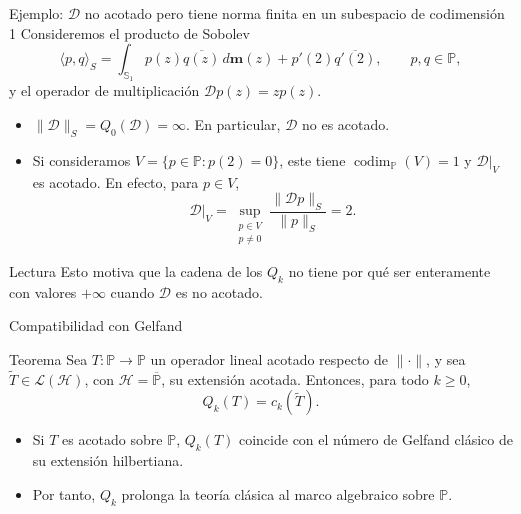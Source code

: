 \documentclass[aspectratio=169,10pt]{beamer}
\newcommand{\Poly}{\mathbb{P}}
\newcommand{\D}{\mathcal{D}}
\begin{document}
\begin{frame}{Ejemplo: $\mathcal D$ no acotado pero tiene norma finita en un subespacio de codimensión 1}
  \small
  Consideremos el producto de Sobolev
  \[
    \langle p,q\rangle_S=\int_{\mathbb S_1}p(z)\overline{q(z)}\,d\mathbf m(z)+p'(2)\overline{q'(2)},
    \qquad p,q\in\Poly,
  \]
  y el operador de multiplicación \(\D p(z)=zp(z)\).

  \begin{itemize}
    \item \(\|\D\|_S = Q_0(\D)=\infty\). En particular, \(\D\) no es acotado.
    \item Si consideramos \(V = \{p \in \Poly : p(2) = 0\}\), este tiene \(\operatorname{codim}_{\Poly}(V) = 1\) y \(\D|_V\) es acotado. En efecto, para \(p \in V\),
          \[
            \D|_V=\sup_{\substack{p\in V\\ p\neq0}} \frac{\|\D p\|_S}{\|p\|_S}=2.
          \]
  \end{itemize}

  \begin{alertblock}{Lectura}
    Esto motiva que la cadena de los \(Q_k\) no tiene por qué ser enteramente con valores $+\infty$ cuando \(\D\) es no acotado.
  \end{alertblock}
\end{frame}

\begin{frame}{Compatibilidad con Gelfand}
  \small
  \begin{block}{Teorema}
    Sea \(T:\Poly\to\Poly\) un operador lineal acotado respecto de \(\|\cdot\|\), y sea \(\widetilde T\in\mathcal L(\mathcal H)\), con \(\mathcal H=\overline{\Poly}\), su extensión acotada. Entonces, para todo \(k\ge0\),
    \[
      Q_k(T)=c_k(\widetilde T).
    \]
  \end{block}

  \medskip
  \begin{itemize}
    \item Si \(T\) es acotado sobre \(\Poly\), \(Q_k(T)\) coincide con el número de Gelfand clásico de su extensión hilbertiana.
    \item Por tanto, \(Q_k\) prolonga la teoría clásica al marco algebraico sobre \(\Poly\).
  \end{itemize}
\end{frame}
\end{document}
